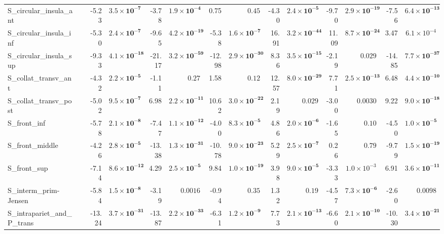 {\begin{longtable}{llrrrrrrrrrrrr}
S\_circular\_insula\_ant &  & -5.23 & $\mathbf{3.5{\times}10^{-7}}$ & -3.78 & $\mathbf{1.9{\times}10^{-4}}$ & 0.75 & $0.45$ & -4.30 & $\mathbf{2.4{\times}10^{-5}}$ & -9.70 & $\mathbf{2.9{\times}10^{-19}}$ & -7.56 & $\mathbf{6.4{\times}10^{-13}}$ \\
S\_circular\_insula\_inf &  & -5.30 & $\mathbf{2.4{\times}10^{-7}}$ & -9.65 & $\mathbf{4.2{\times}10^{-19}}$ & -5.38 & $\mathbf{1.6{\times}10^{-7}}$ & 16.91 & $\mathbf{3.2{\times}10^{-44}}$ & 11.09 & $\mathbf{8.7{\times}10^{-24}}$ & 3.47 & $6.1{\times}10^{-4}$ \\
S\_circular\_insula\_sup &  & -9.33 & $\mathbf{4.1{\times}10^{-18}}$ & -21.17 & $\mathbf{3.2{\times}10^{-59}}$ & -12.98 & $\mathbf{2.9{\times}10^{-30}}$ & 8.36 & $\mathbf{3.5{\times}10^{-15}}$ & -2.19 & $0.029$ & -14.85 & $\mathbf{7.7{\times}10^{-37}}$ \\
S\_collat\_transv\_ant &  & -4.32 & $\mathbf{2.2{\times}10^{-5}}$ & -1.11 & $0.27$ & 1.58 & $0.12$ & 12.57 & $\mathbf{8.0{\times}10^{-29}}$ & 7.71 & $\mathbf{2.5{\times}10^{-13}}$ & 6.48 & $\mathbf{4.4{\times}10^{-10}}$ \\
S\_collat\_transv\_post &  & -5.02 & $\mathbf{9.5{\times}10^{-7}}$ & 6.98 & $\mathbf{2.2{\times}10^{-11}}$ & 10.62 & $\mathbf{3.0{\times}10^{-22}}$ & 2.19 & $0.029$ & -3.00 & $0.0030$ & 9.22 & $\mathbf{9.0{\times}10^{-18}}$ \\
S\_front\_inf &  & -5.78 & $\mathbf{2.1{\times}10^{-8}}$ & -7.47 & $\mathbf{1.1{\times}10^{-12}}$ & -4.00 & $\mathbf{8.3{\times}10^{-5}}$ & 4.86 & $\mathbf{2.0{\times}10^{-6}}$ & -1.65 & $0.10$ & -4.50 & $\mathbf{1.0{\times}10^{-5}}$ \\
S\_front\_middle &  & -4.26 & $\mathbf{2.8{\times}10^{-5}}$ & -13.38 & $\mathbf{1.3{\times}10^{-31}}$ & -10.78 & $\mathbf{9.0{\times}10^{-23}}$ & 5.29 & $\mathbf{2.5{\times}10^{-7}}$ & 0.26 & $0.79$ & -9.79 & $\mathbf{1.5{\times}10^{-19}}$ \\
S\_front\_sup &  & -7.14 & $\mathbf{8.6{\times}10^{-12}}$ & 4.29 & $\mathbf{2.5{\times}10^{-5}}$ & 9.84 & $\mathbf{1.0{\times}10^{-19}}$ & 3.98 & $\mathbf{9.0{\times}10^{-5}}$ & -3.33 & $1.0{\times}10^{-3}$ & 6.91 & $\mathbf{3.6{\times}10^{-11}}$ \\
S\_interm\_prim-Jensen &  & -5.84 & $\mathbf{1.5{\times}10^{-8}}$ & -3.19 & $0.0016$ & -0.94 & $0.35$ & 1.32 & $0.19$ & -4.57 & $\mathbf{7.3{\times}10^{-6}}$ & -2.60 & $0.0098$ \\
S\_intrapariet\_and\_P\_trans &  & -13.24 & $\mathbf{3.7{\times}10^{-31}}$ & -13.87 & $\mathbf{2.2{\times}10^{-33}}$ & -6.31 & $\mathbf{1.2{\times}10^{-9}}$ & 7.73 & $\mathbf{2.1{\times}10^{-13}}$ & -6.60 & $\mathbf{2.1{\times}10^{-10}}$ & -10.30 & $\mathbf{3.4{\times}10^{-21}}$ \\

\end{longtable}}
